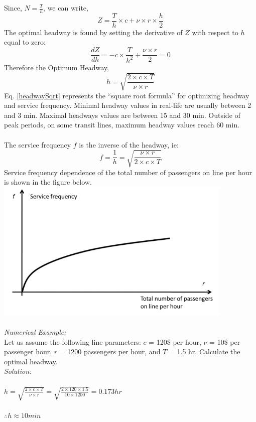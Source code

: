 Since, $ N = \frac{T}{h}$, we can write,
\begin{equation}
	Z = \frac{T}{h} \times c + \nu \times r \times \frac{h}{2}
\end{equation}
The optimal headway is found by setting the derivative of $ Z $ with respect to $ h $ equal to zero:
\begin{equation}
	\frac{dZ}{dh} = -c \times \frac{T}{h^2} + \frac{\nu \times r}{2} = 0
\end{equation}
Therefore the Optimum Headway,
\begin{equation}
	\label{headwaySqrt}
	h = \sqrt{\frac{2 \times c \times T}{\nu \times r}}
\end{equation}
Eq. \ref{headwaySqrt} represents the “square root formula” for optimizing headway and service frequency. Minimal headway values in real-life are usually between 2 and 3 min. Maximal headways values are between 15 and 30 min. Outside of peak periods, on some transit lines, maximum headway values reach 60 min.\\\\
The service frequency $ f $ is the inverse of the headway, ie:
\begin{equation}
	f = \frac{1}{h} = \sqrt{\frac{\nu \times r}{2 \times c \times T}}
\end{equation}
Service frequency dependence of the total number of passengers on line per hour is shown in the figure below.\\
\includegraphics{gfx/fig26.png}\\\\
\textit{Numerical Example:}\\
Let us assume the following line parameters: $ c $ = 120\$ per hour, $ \nu $ = 10\$ per passenger hour, $ r $ = 1200 passengers per hour, and $ T $ = 1.5 hr. Calculate the optimal headway.\\
\textit{Solution:}\\\\
$ 	h = \sqrt{\frac{2 \times c \times T}{\nu \times r}} = \sqrt{\frac{2 \times 120 \times 1.5}{10 \times 1200}} = 0.173 hr$\\\\
$ \therefore h \approx 10 min$
